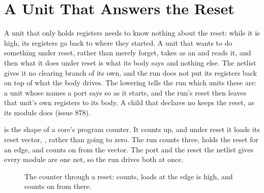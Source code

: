 \section{A Unit That Answers the Reset}
\label{sec:x-ownrst}

A unit that only holds registers needs to know nothing about the
reset: while it is high, its registers go back to where they started.
A unit that wants to do something under reset, rather than merely
forget, takes  as an  and reads it, and then
what it does under reset is what its body says and nothing else. The
netlist gives it no clearing branch of its own, and the run does not
put its registers back on top of what the body drives. The lowering
tells the run which units these are: a unit whose  names a
port  says so as it starts, and the run's reset then leaves
that unit's own registers to its body. A child that declares no
 keeps the reset, as its module does (issue 878).

 is the shape of a core's program counter. It counts up,
and under reset it loads its reset vector, , rather than
going to zero. The run counts three, holds the reset for an edge, and
counts on from the vector. The port and the reset the netlist gives
every module are one net, so the run drives both at once.

\begin{figure}[htbp]
\centering

\caption{The counter through a reset:  counts, loads
 at the edge  is high, and counts on from there.}
\label{fig:x-ownrst}
\end{figure}




